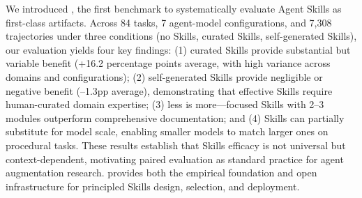 We introduced \benchmarkName{}, the first benchmark to systematically evaluate Agent Skills as first-class artifacts. Across 84 tasks, 7 agent-model configurations, and 7,308 trajectories under three conditions (no Skills, curated Skills, self-generated Skills), our evaluation yields four key findings: (1) curated Skills provide substantial but variable benefit (+16.2 percentage points average, with high variance across domains and configurations); (2) self-generated Skills provide negligible or negative benefit (--1.3pp average), demonstrating that effective Skills require human-curated domain expertise; (3) less is more---focused Skills with 2--3 modules outperform comprehensive documentation; and (4) Skills can partially substitute for model scale, enabling smaller models to match larger ones on procedural tasks. These results establish that Skills efficacy is not universal but context-dependent, motivating paired evaluation as standard practice for agent augmentation research. \benchmarkName{} provides both the empirical foundation and open infrastructure for principled Skills design, selection, and deployment.


